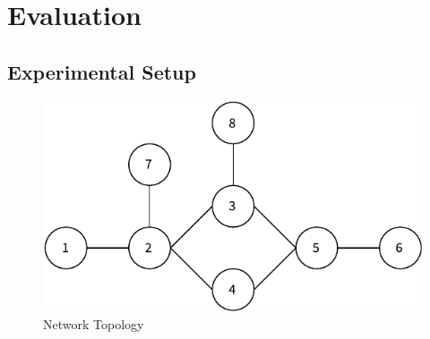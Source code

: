 \documentclass[conference]{IEEEtran}
\begin{document}

\section{Evaluation}
\subsection{Experimental Setup}

\begin{figure}[t]
  \centering
  \includegraphics[width=0.7\linewidth]{./figures/topo.pdf}
  \caption{Network Topology}
  \label{fig:network-topology}
\end{figure}

\end{document}

